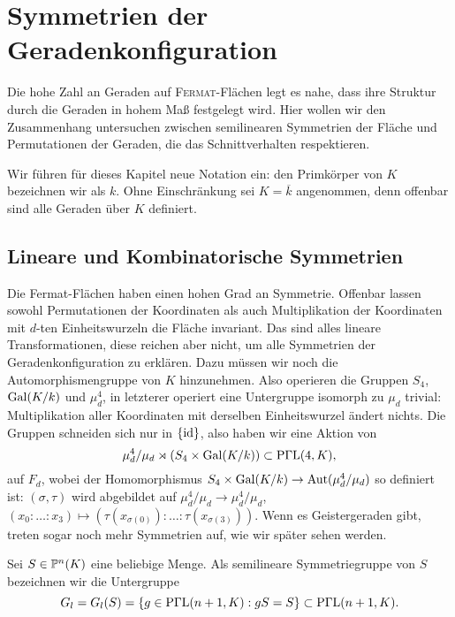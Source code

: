 \chapter{Symmetrien der Geradenkonfiguration} \label{chap:configsymm}
Die hohe Zahl an Geraden auf \textsc{Fermat}-Flächen legt es nahe, dass ihre Struktur durch die Geraden in hohem Maß festgelegt wird. Hier wollen wir den Zusammenhang untersuchen zwischen semilinearen Symmetrien der Fläche und Permutationen der Geraden, die das Schnittverhalten respektieren.

Wir führen für dieses Kapitel neue Notation ein: den Primkörper von $K$ bezeichnen wir als $k$. Ohne Einschränkung sei $K = \overline k$ angenommen, denn offenbar sind alle Geraden über $K$ definiert.

\section{Lineare und Kombinatorische Symmetrien}
Die Fermat-Flächen haben einen hohen Grad an Symmetrie. Offenbar lassen sowohl Permutationen der Koordinaten als auch Multiplikation der Koordinaten mit $d$-ten Einheitswurzeln die Fläche invariant. Das sind alles lineare Transformationen, diese reichen aber nicht, um alle Symmetrien der Geradenkonfiguration zu erklären. Dazu müssen wir noch die Automorphismengruppe von $K$ hinzunehmen. Also operieren die Gruppen $S_4$, $\Gal K/k$ und $\mu_d^4$, in letzterer operiert eine Untergruppe isomorph zu $\mu_d$ trivial: Multiplikation aller Koordinaten mit derselben Einheitswurzel ändert nichts. Die Gruppen schneiden sich nur in $\{\operatorname{id}\}$, also haben wir eine Aktion von
\begin{equation}
\mu_d^4 / \mu_d \rtimes (S_4 \times \Gal K/k) \subset \PGaL 4K,
\end{equation}
auf $F_d$, wobei der Homomorphismus $S_4 \times \Gal K/k \rightarrow \Aut(\mu_d^4 / \mu_d)$ so definiert ist: $(\sigma, \tau)$ wird abgebildet auf $\mu_d^4 / \mu_d \to \mu_d^4 / \mu_d$, $(x_0:\dots:x_3) \mapsto (\tau(x_{\sigma(0)}):\dots:\tau(x_{\sigma(3)}))$. Wenn es Geistergeraden gibt, treten sogar noch mehr Symmetrien auf, wie wir später sehen werden.

\begin{defin}
Sei $S \in \mathbb P^{n}(K)$ eine beliebige Menge. Als semilineare Symmetriegruppe von $S$ bezeichnen wir die Untergruppe
\begin{equation}
G_l = G_l(S) = \{ g \in \mathrm{P\Gamma L}(n+1,K): gS = S \} \subset \mathrm{P\Gamma L}(n+1,K).
\end{equation}
\end{defin}

